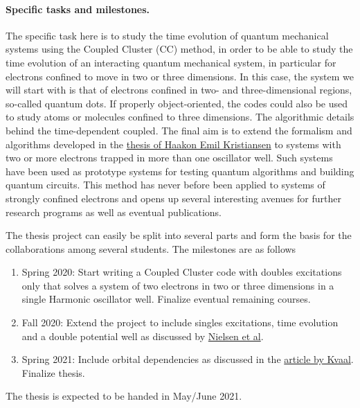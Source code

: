 \documentclass[%
oneside,                 %
final,                   %
10pt]{article}
\begin{document}
\paragraph{Specific tasks and milestones.}
The specific task here is to study the time evolution of quantum mechanical systems using the Coupled Cluster (CC) method, in order to be able to study
the time evolution of an interacting quantum mechanical system, in
particular for electrons confined to move in two or three
dimensions. In this case, the system we will start with is that of
electrons confined in two- and three-dimensional regions, so-called quantum dots.
If properly object-oriented, the codes could also be used to study
atoms or molecules confined to three dimensions. The algorithmic
details behind the time-dependent coupled.  The final aim is to extend the
formalism and algorithms developed in the \href{{https://github.com/haakoek/PythonVersionMaster/tree/master/Thesis/Chapters}}{thesis of Haakon Emil Kristiansen}  to systems
with two or more electrons trapped in more than one oscillator
well. Such systems have been used as prototype systems for testing
quantum algorithms and building quantum circuits.  This method has
never before been applied to systems of strongly confined electrons
and opens up several interesting avenues for further research programs
as well as eventual publications.

The thesis project can easily be split into several parts and form the basis for the collaborations among several students. The milestones are as follows
\begin{enumerate}
\item Spring 2020: Start writing a Coupled Cluster code with doubles excitations only that solves a system of two electrons in two or three dimensions in a single Harmonic oscillator well. Finalize eventual remaining courses.

\item Fall 2020: Extend the project to include singles excitations, time evolution and a double potential well as discussed by \href{{https://journals.aps.org/prb/abstract/10.1103/PhysRevB.85.035319}}{Nielsen et al}.

\item Spring 2021: Include orbital dependencies as discussed in the \href{{http://aip.scitation.org/doi/abs/10.1063/1.4718427}}{article by Kvaal}. Finalize thesis. 
\end{enumerate}

\noindent
The thesis is expected to be handed in May/June  2021.
\end{document}
